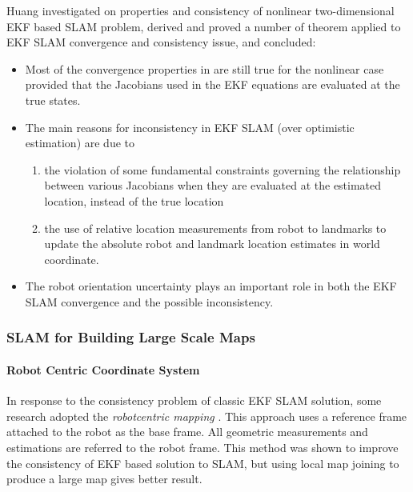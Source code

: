 Huang investigated \cite{huang_convergence_2007} on properties and
consistency of nonlinear two-dimensional EKF based SLAM problem,
derived and proved a number of theorem applied to EKF SLAM convergence
and consistency issue, and concluded:

\begin{itemize}
  \item Most of the convergence properties in
  \cite{dissanayake_solution_2001} are still true for the nonlinear
  case provided that the Jacobians used in the EKF equations are
  evaluated at the true states.
  \item The main reasons for inconsistency in EKF SLAM (over
  optimistic estimation) are due to 
  \begin{enumerate}
    \item the violation of some fundamental constraints governing the
    relationship between various Jacobians when they are evaluated at
    the estimated location, instead of the true location
    \item the use of relative location measurements from robot to
    landmarks to update the absolute robot and landmark location
    estimates in world coordinate.
  \end{enumerate}
  \item The robot orientation uncertainty plays an important role in
  both the EKF SLAM convergence and the possible inconsistency. 
\end{itemize}

\subsubsection{SLAM for Building Large Scale Maps}

\paragraph{Robot Centric Coordinate System}In response to the
consistency problem of classic EKF SLAM solution, some research
adopted the \emph{robotcentric mapping} \cite{castellanos_limits_2004}
\cite{civera_1-point_2009}. This approach uses a reference frame
attached to the robot as the base frame. All geometric measurements
and estimations are referred to the robot frame. This method was shown
to improve the consistency of EKF based solution to SLAM, but using
local map joining to produce a large map gives better result. 

